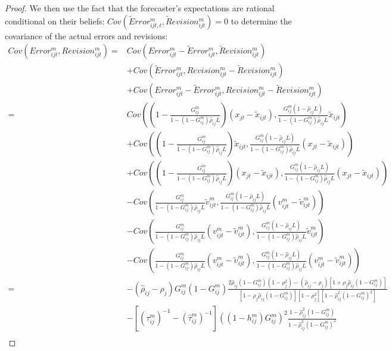 \begin{proof}
We then use the fact that the forecaster's expectations are rational conditional on their beliefs: $Cov(\tilde Error_{ijt,t}^m,\tilde Revision_{ijt}^m)=0$ to determine the covariance of the actual errors and revisions:
$$\begin{array}{rl}Cov\left(Error_{ijt}^m,Revision_{ijt}^m\right)=& Cov\left(Error_{ijt}^m-\tilde Error_{ijt}^m,\tilde Revision_{ijt}^m\right) \\
&+ Cov\left(\tilde Error_{ijt}^m,Revision_{ijt}^m-\tilde Revision_{ijt}^m\right)\\
&+Cov\left(Error_{ijt}^m-\tilde Error_{ijt}^m,Revision_{ijt}^m-\tilde Revision_{ijt}^m\right)\\
=&Cov\left(\left(1-\frac{G_{ij}^m}{1-(1-G_{ij}^m)\hat\rho_{ij}L}\right)(x_{jt}-\tilde x_{ijt}),\frac{G_{ij}^m(1-\hat\rho_{ij}L)}{1-(1-G_{ij}^m)\hat\rho_{ij}L}\tilde x_{ijt}\right)\\
&+Cov\left(\left(1-\frac{G_{ij}^m}{1-(1-G_{ij}^m)\hat\rho_{ij}L}\right)\tilde x_{ijt},\frac{G_{ij}^m(1-\hat\rho_{ij}L)}{1-(1-G_{ij}^m)\hat\rho_{ij}L}(x_{jt}-\tilde x_{ijt})\right)\\
&+Cov\left(\left(1-\frac{G_{ij}^m}{1-(1-G_{ij}^m)\hat\rho_{ij}L}\right)(x_{jt}-\tilde x_{ijt}),\frac{G_{ij}^m(1-\hat\rho_{ij}L)}{1-(1-G_{ij}^m)\hat\rho_{ij}L}(x_{jt}-\tilde x_{ijt})\right)\\
&-Cov\left(\frac{G_{ij}^m}{1-(1-G_{ij}^m)\hat\rho_{ij}L}\tilde v_{ijt}^m,\frac{G_{ij}^m(1-\hat\rho_{ij}L)}{1-(1-G_{ij}^m)\hat\rho_{ij}L}( v_{ijt}^m-\tilde v_{ijt}^m)\right)\\
&-Cov\left(\frac{G_{ij}^m}{1-(1-G_{ij}^m)\hat\rho_{ij}L}(v_{ijt}^m-\tilde v_{ijt}^m),\frac{G_{ij}^m(1-\hat\rho_{ij}L)}{1-(1-G_{ij}^m)\hat\rho_{ij}L}\tilde v_{ijt}^m\right)\\
&-Cov\left(\frac{G_{ij}^m}{1-(1-G_{ij}^m)\hat\rho_{ij}L}(v_{ijt}^m-\tilde v_{ijt}^m),\frac{G_{ij}^m(1-\hat\rho_{ij}L)}{1-(1-G_{ij}^m)\hat\rho_{ij}L}(v_{ijt}^m-\tilde v_{ijt}^m)\right)\\
=&-(\hat\rho_{ij}-\rho_j)G_{ij}^m(1-G_{ij}^m)\frac{2\hat\rho_{ij}(1-G_{ij}^m)(1-\rho_j^2)-(\hat\rho_{ij}-\rho_j)[1+\rho_j\hat\rho_{ij}(1-G_{ij}^m)]}{[1-\rho_j\hat\rho_{ij}(1-G_{ij}^m)][1-\rho_j^2][1-\hat\rho_{ij}^2(1-G_{ij}^m)^2]}\\
&-[(\tau_{ij}^m)^{-1}-(\hat\tau_{ij}^m)^{-1}]((1-h_{ij}^m) G_{ij}^m)^2\frac{1-\hat\rho_{ij}^2(1-G_{ij}^m)}{1-\hat\rho_{ij}^2(1-G_{ij}^m)^2}\\
\end{array}$$


\end{proof}
